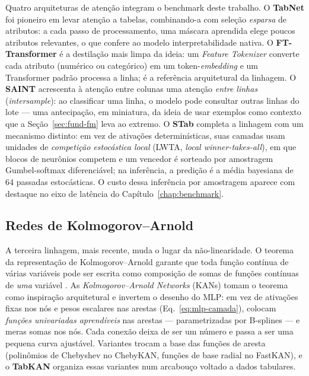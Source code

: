 Quatro arquiteturas de atenção integram o benchmark deste trabalho. O
\textbf{TabNet}
\citep{arik2021} foi pioneiro em levar atenção a tabelas, combinando-a com
seleção \emph{esparsa} de atributos: a cada passo de processamento, uma
máscara aprendida elege poucos atributos relevantes, o que confere ao
modelo interpretabilidade nativa. O \textbf{FT-Transformer}
\citep{gorishniy2021} é a destilação mais limpa da ideia: um
\emph{Feature Tokenizer} converte cada atributo (numérico ou categórico) em
um token-\emph{embedding} e um Transformer padrão processa a linha; é a
referência arquitetural da linhagem. O \textbf{SAINT} \citep{somepalli2021}
acrescenta à atenção entre colunas uma atenção \emph{entre linhas}
(\emph{intersample}): ao classificar uma linha, o modelo pode consultar
outras linhas do lote --- uma antecipação, em miniatura, da ideia de usar
exemplos como contexto que a Seção~\ref{sec:fund-fm} leva ao extremo. O
\textbf{STab} \citep{stab-ref} completa a linhagem com um mecanismo
distinto: em vez de ativações determinísticas, suas camadas usam
unidades de \emph{competição estocástica local} (LWTA, \emph{local
winner-takes-all}), em que blocos de neurônios competem e um vencedor é
sorteado por amostragem Gumbel-softmax diferenciável; na inferência, a
predição é a média bayesiana de 64 passadas estocásticas. O custo dessa
inferência por amostragem aparece com destaque no eixo de latência do
Capítulo~\ref{chap:benchmark}.

\subsection{Redes de Kolmogorov--Arnold}

A terceira linhagem, mais recente, muda o lugar da não-linearidade. O
teorema da representação de Kolmogorov--Arnold garante que toda função
contínua de várias variáveis pode ser escrita como composição de somas de
funções contínuas de \emph{uma} variável \citep{kolmogorov1957,arnold1957}. As \emph{Kolmogorov--Arnold Networks}
(KANs) \citep{kan2024} tomam o teorema como inspiração arquitetural e
invertem o desenho do MLP: em vez de ativações fixas nos nós e pesos
escalares nas arestas (Eq.~\ref{eq:mlp-camada}), colocam \emph{funções
univariadas aprendíveis} nas arestas --- parametrizadas por B-splines ---
e meras somas nos nós. Cada conexão deixa de ser um número e passa a ser
uma pequena curva ajustável. Variantes trocam a base das funções de aresta
(polinômios de Chebyshev no ChebyKAN, funções de base radial no FastKAN), e
o \textbf{TabKAN} \citep{tabkan2025} organiza essas variantes num arcabouço
voltado a dados tabulares.

